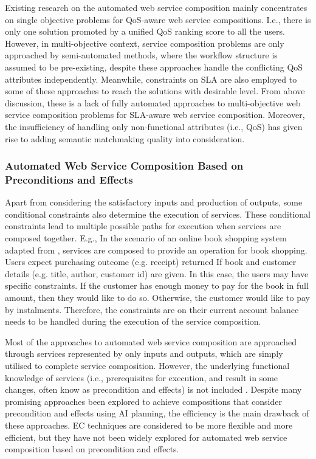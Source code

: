 Existing research on the automated web service composition mainly concentrates on single objective problems for QoS-aware web service compositions. I.e., there is only one solution promoted by a unified QoS ranking score to all the users. However, in multi-objective context, service composition problems  \cite{liu2005dynamic,wada2012e3,yao2009qos,yin2014hybrid} are only approached by semi-automated methods, where the workflow structure is assumed to be pre-existing, despite these approaches handle the conflicting QoS attributes independently. Meanwhile, constraints on SLA are also employed to some of these approaches to reach the solutions with desirable level. From above discussion, these is a lack of fully automated approaches to multi-objective web service composition problems for SLA-aware web service composition. Moreover, the insufficiency of handling only non-functional attributes (i.e., QoS) has given rise to adding semantic matchmaking quality into consideration.

\subsubsection{Automated Web Service Composition Based on Preconditions and Effects}
Apart from considering the satisfactory inputs and production of outputs, some conditional constraints also determine the execution of services.  These conditional constraints lead to multiple possible paths for execution when services are composed together. E.g., In the scenario of an online book shopping system adapted from \cite{wang2014automated}, services are composed to provide an operation for book shopping.  Users expect purchasing outcome (e.g. receipt) returned If book and customer details (e.g. title, author, customer id) are given. In this case, the users may have specific constraints. If the customer has enough money to pay for the book in full amount, then they would like to do so. Otherwise, the customer would like to pay by instalments. Therefore, the constraints are on their current account balance needs to be handled during the execution of the service composition.

Most of the approaches to automated web service composition are approached through services represented by only inputs and outputs, which are simply utilised to complete service composition. However, the underlying functional knowledge of services (i.e., prerequisites for execution, and result in some changes, often know as precondition and effects) is not included \cite{paliwal2012semantics}. Despite many promising approaches \cite{DBLP:journals/soca/BoustilMS14} been explored to achieve compositions that consider precondition and effects using AI planning, the efficiency is the main drawback of these approaches. EC techniques are considered to be more flexible and more efficient, but they have not been widely explored for automated web service composition based on precondition and effects.

